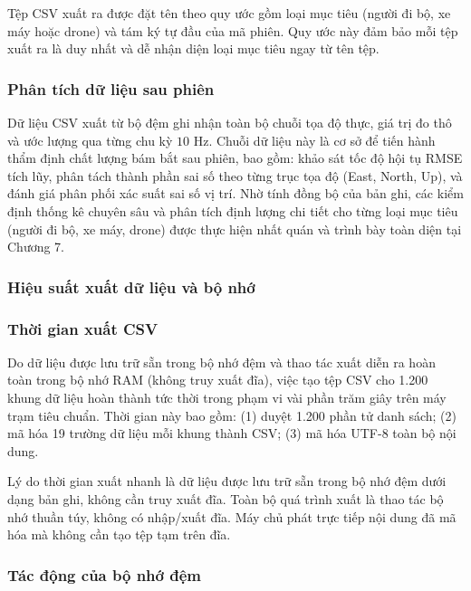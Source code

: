\hspace{0.5cm} Tệp CSV xuất ra được đặt tên theo quy ước gồm loại mục tiêu (người đi bộ, xe máy hoặc drone) và tám ký tự đầu của mã phiên. Quy ước này đảm bảo mỗi tệp xuất ra là duy nhất và dễ nhận diện loại mục tiêu ngay từ tên tệp.

\subsubsection{Phân tích dữ liệu sau phiên}

\hspace{0.5cm} Dữ liệu CSV xuất từ bộ đệm ghi nhận toàn bộ chuỗi tọa độ thực, giá trị đo thô và ước lượng qua từng chu kỳ $10$ Hz. Chuỗi dữ liệu này là cơ sở để tiến hành thẩm định chất lượng bám bắt sau phiên, bao gồm: khảo sát tốc độ hội tụ RMSE tích lũy, phân tách thành phần sai số theo từng trục tọa độ (East, North, Up), và đánh giá phân phối xác suất sai số vị trí. Nhờ tính đồng bộ của bản ghi, các kiểm định thống kê chuyên sâu và phân tích định lượng chi tiết cho từng loại mục tiêu (người đi bộ, xe máy, drone) được thực hiện nhất quán và trình bày toàn diện tại Chương 7.

\subsubsection{Hiệu suất xuất dữ liệu và bộ nhớ}

\subsubsection{Thời gian xuất CSV}

\hspace{0.5cm} Do dữ liệu được lưu trữ sẵn trong bộ nhớ đệm và thao tác xuất diễn ra hoàn toàn trong bộ nhớ RAM (không truy xuất đĩa), việc tạo tệp CSV cho 1.200 khung dữ liệu hoàn thành tức thời trong phạm vi vài phần trăm giây trên máy trạm tiêu chuẩn. Thời gian này bao gồm: (1) duyệt 1.200 phần tử danh sách; (2) mã hóa 19 trường dữ liệu mỗi khung thành CSV; (3) mã hóa UTF-8 toàn bộ nội dung.

Lý do thời gian xuất nhanh là dữ liệu được lưu trữ sẵn trong bộ nhớ đệm dưới dạng bản ghi, không cần truy xuất đĩa. Toàn bộ quá trình xuất là thao tác bộ nhớ thuần túy, không có nhập/xuất đĩa. Máy chủ phát trực tiếp nội dung đã mã hóa mà không cần tạo tệp tạm trên đĩa.

\subsubsection{Tác động của bộ nhớ đệm}

